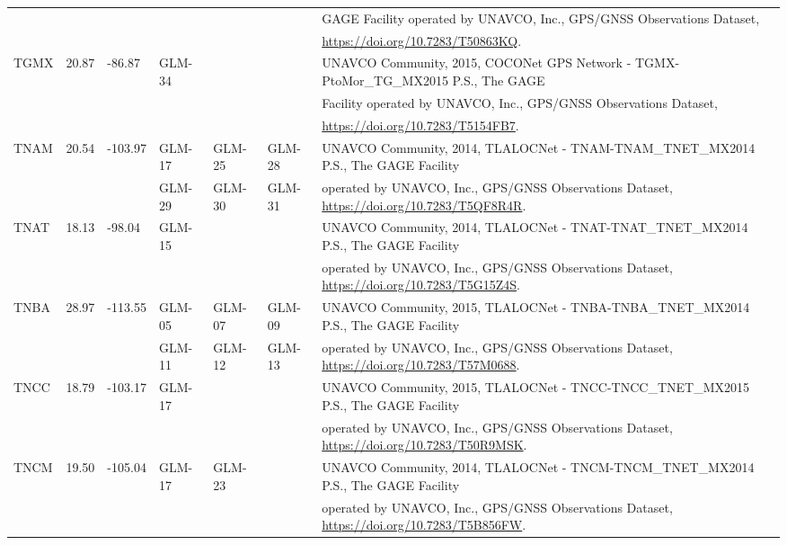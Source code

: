\begin{landscape}
\begin{longtable}{llllllp{12cm}}
    &&&&&& GAGE Facility operated by UNAVCO, Inc., GPS/GNSS Observations Dataset,  \\
    &&&&&& \url{https://doi.org/10.7283/T50863KQ}. \\\hline
    \multirow{3}{*}{TGMX}  & \multirow{3}{*}{20.87} & \multirow{3}{*}{-86.87} & \multirow{3}{*}{GLM-34} & & & UNAVCO Community, 2015, COCONet GPS Network - TGMX-PtoMor\_TG\_MX2015 P.S., The GAGE \\
    &&&&&& Facility operated by UNAVCO, Inc., GPS/GNSS Observations Dataset,  \\
    &&&&&& \url{https://doi.org/10.7283/T5154FB7}. \\\hline
    \multirow{2}{*}{TNAM} & \multirow{2}{*}{20.54} & \multirow{2}{*}{-103.97} & GLM-17 & GLM-25 & GLM-28  & UNAVCO Community, 2014, TLALOCNet - TNAM-TNAM\_TNET\_MX2014 P.S., The GAGE Facility \\
    &&& GLM-29 & GLM-30 & GLM-31 & operated by UNAVCO, Inc., GPS/GNSS Observations Dataset, \url{https://doi.org/10.7283/T5QF8R4R}.\\\hline
    \multirow{2}{*}{TNAT} & \multirow{2}{*}{18.13} & \multirow{2}{*}{-98.04} & \multirow{2}{*}{GLM-15} & & & UNAVCO Community, 2014, TLALOCNet - TNAT-TNAT\_TNET\_MX2014 P.S., The GAGE Facility \\
    &&&&&& operated by UNAVCO, Inc., GPS/GNSS Observations Dataset, \url{https://doi.org/10.7283/T5G15Z4S}. \\\hline
    \multirow{2}{*}{TNBA} & \multirow{2}{*}{28.97} & \multirow{2}{*}{-113.55} & GLM-05 & GLM-07 & GLM-09  & UNAVCO Community, 2015, TLALOCNet - TNBA-TNBA\_TNET\_MX2014 P.S., The GAGE Facility  \\
    &&& GLM-11 & GLM-12 & GLM-13 & operated by UNAVCO, Inc., GPS/GNSS Observations Dataset, \url{https://doi.org/10.7283/T57M0688}.\\\hline
    \multirow{2}{*}{TNCC} & \multirow{2}{*}{18.79} & \multirow{2}{*}{-103.17} & \multirow{2}{*}{GLM-17} & & & UNAVCO Community, 2015, TLALOCNet - TNCC-TNCC\_TNET\_MX2015 P.S., The GAGE Facility \\
    &&&&&& operated by UNAVCO, Inc., GPS/GNSS Observations Dataset, \url{https://doi.org/10.7283/T50R9MSK}.\\\hline
    \multirow{2}{*}{TNCM} & \multirow{2}{*}{19.50} & \multirow{2}{*}{-105.04} & \multirow{2}{*}{GLM-17} & \multirow{2}{*}{GLM-23} & & UNAVCO Community, 2014, TLALOCNet - TNCM-TNCM\_TNET\_MX2014 P.S., The GAGE Facility \\
    &&&&&& operated by UNAVCO, Inc., GPS/GNSS Observations Dataset, \url{https://doi.org/10.7283/T5B856FW}.\\\hline

\end{longtable}
\end{landscape}
